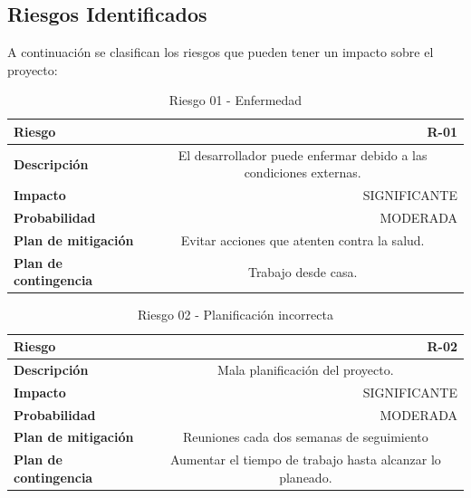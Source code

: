     \subsection{Riesgos Identificados}
    \label{sec:riesgos.identificados}
        A continuación se clasifican los riesgos que pueden tener un impacto sobre el proyecto:
        \begin{table}[H]
        \centering
        \begin{tabular}{|l|c}
        \hline
        \textbf{Riesgo}               & \multicolumn{1}{r|}{R-01}                                             \\ \hline
        \textbf{Descripción}          & \multicolumn{1}{X|}{El desarrollador puede enfermar debido a las  condiciones externas.}
        \\ \hline
        \textbf{Impacto}              & \multicolumn{1}{r|}{SIGNIFICANTE}                                             \\ \hline
        \textbf{Probabilidad}         & \multicolumn{1}{r|}{MODERADA}                                         \\ \hline
        \textbf{Plan de mitigación}   & \multicolumn{1}{X|}{Evitar acciones que atenten contra la salud. }
        \\ \hline
        \textbf{Plan de contingencia} & \multicolumn{1}{X|}{Trabajo desde casa.}
        \\ \hline
        \end{tabular}
        \caption{Riesgo 01 - Enfermedad}
        \label{table:riskill}
        \end{table}
        \begin{table}[H]
        \centering
        \begin{tabular}{|l|c}
        \hline
        \textbf{Riesgo}               & \multicolumn{1}{r|}{R-02}                                             \\ \hline
        \textbf{Descripción}          & \multicolumn{1}{X|}{Mala planificación del proyecto.}
        \\ \hline
        \textbf{Impacto}              & \multicolumn{1}{r|}{SIGNIFICANTE}                                             \\ \hline
        \textbf{Probabilidad}         & \multicolumn{1}{r|}{MODERADA}                                         \\ \hline
        \textbf{Plan de mitigación}   & \multicolumn{1}{X|}{Reuniones cada dos semanas de seguimiento }
        \\ \hline
        \textbf{Plan de contingencia} & \multicolumn{1}{X|}{Aumentar el tiempo de trabajo hasta alcanzar lo planeado.}
        \\ \hline
        \end{tabular}
        \caption{Riesgo 02 - Planificación incorrecta}
        \label{table:malaplanif}
        \end{table}

